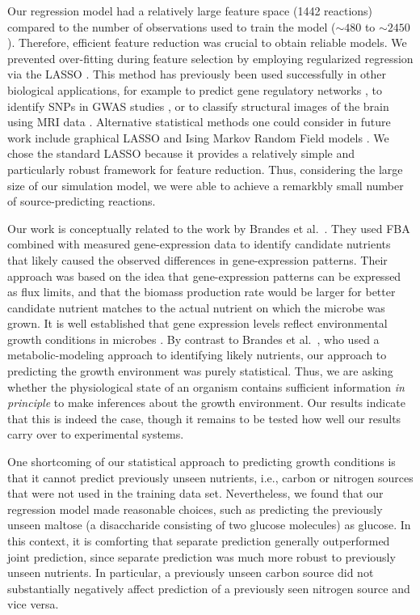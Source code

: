 \documentclass[12pt]{article}
\begin{document}
Our regression model had a relatively large feature space (1442 reactions) compared to the number of observations used to train the model ($\mathord{\sim}480$ to $\mathord{\sim}2450$). Therefore, efficient feature reduction was crucial to obtain reliable models. We prevented over-fitting during feature selection by employing regularized regression via the LASSO \cite{Tibshirani1996}. This method has previously been used successfully in other biological applications, for example to predict gene regulatory networks \cite{Menendezetal2010}, to identify SNPs in GWAS studies \cite{Wuetal2009}, or to classify structural images of the brain using MRI data \cite{Casanovaetal2011,Casanovaetal2012,Wangetal2012}. Alternative statistical methods one could consider in future work include graphical LASSO \cite{Friedmanetal2008} and Ising Markov Random Field models \cite{Ravikumaretal2010}. We chose the standard LASSO because it provides a relatively simple and particularly robust framework for feature reduction. Thus, considering the large size of our simulation model, we were able to achieve a remarkbly small number of source-predicting reactions.

Our work is conceptually related to the work by Brandes et al.~\cite{Brandesetal2012}. They used FBA combined with measured gene-expression data to identify candidate nutrients that likely caused the observed differences in gene-expression patterns. Their approach was based on the idea that gene-expression patterns can be expressed as flux limits, and that the biomass production rate would be larger for better candidate nutrient matches to the actual nutrient on which the microbe was grown. It is well established that gene expression levels reflect environmental growth conditions in microbes \cite{Schnappingeretal2003,Baevetal2006}. By contrast to Brandes et al.~\cite{Brandesetal2012}, who used a metabolic-modeling approach to identifying likely nutrients, our approach to predicting the growth environment was purely statistical. Thus, we are asking whether the physiological state of an organism contains sufficient information \emph{in principle} to make inferences about the growth environment. Our results indicate that this is indeed the case, though it remains to be tested how well our results carry over to experimental systems.

One shortcoming of our statistical approach to predicting growth conditions is that it cannot predict previously unseen nutrients, i.e., carbon or nitrogen sources that were not used in the training data set. Nevertheless, we found that our regression model made reasonable choices, such as predicting the previously unseen maltose (a disaccharide consisting of two glucose molecules) as glucose. In this context, it is comforting that separate prediction generally outperformed joint prediction, since separate prediction was much more robust to previously unseen nutrients. In particular, a previously unseen carbon source did not substantially negatively affect prediction of a previously seen nitrogen source and vice versa.
\end{document}
